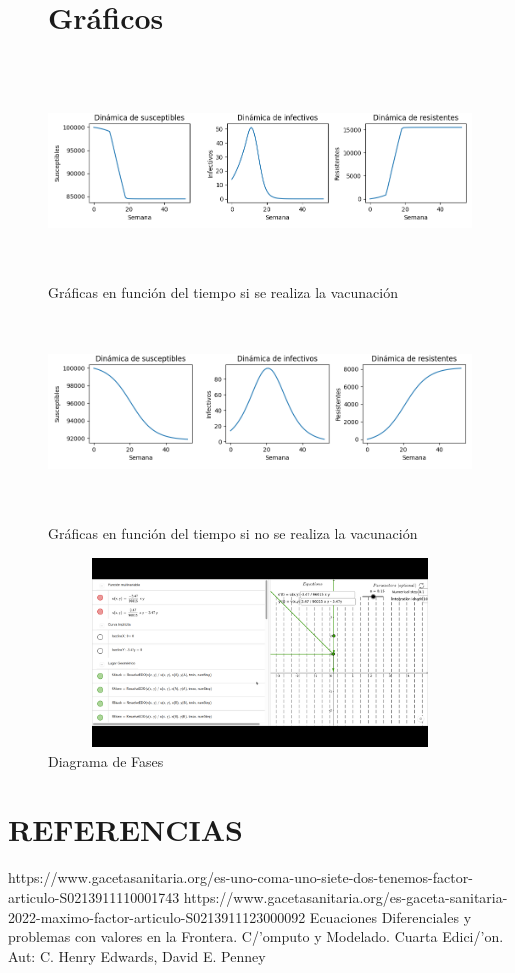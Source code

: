 \documentclass{wscpaperproc}
\theoremstyle{wsc}
\begin{document}
\begin{figure}
	\section*{Gr\'aficos}\\

	\centering
	\includegraphics[width=1.0\textwidth,height=5cm]{Figure_1.png}
	\caption{Gráficas en función del tiempo si se realiza la vacunación}
	\centering
	\includegraphics[width=1.0\textwidth,height=5cm]{Figure_2.png}
	\caption{Gráficas en función del tiempo si no se realiza la vacunación}\centering
	\includegraphics[width=1.0\textwidth,height=5cm]{fig3.jpg}
	\caption{Diagrama de Fases }

\end{figure}

\section*{REFERENCIAS}
https://www.gacetasanitaria.org/es-uno-coma-uno-siete-dos-tenemos-factor-articulo-S0213911110001743
https://www.gacetasanitaria.org/es-gaceta-sanitaria-2022-maximo-factor-articulo-S0213911123000092
Ecuaciones Diferenciales y problemas con valores en la Frontera. C/'omputo y Modelado. Cuarta Edici/'on. Aut: C. Henry Edwards, David E. Penney
\end{document}
